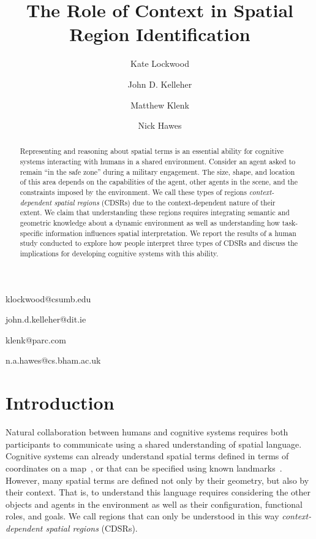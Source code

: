\documentclass[11pt,letterpaper]{article}
\begin{document}
 

\title{The Role of Context in Spatial Region Identification}
 
\author{Kate Lockwood}{klockwood@csumb.edu}
\address{ITCD Department, California State University - Monterey Bay}
\author{John D. Kelleher}{john.d.kelleher@dit.ie}
\address{Applied Intelligence Research Centre, Dublin Institute of Technology }
\author{Matthew Klenk}{klenk@parc.com}
\address{Palo Alto Research Center, Palo Alto CA }
\author{Nick Hawes}{n.a.hawes@cs.bham.ac.uk}
\address{School of Computer Science, University of Birmingham, UK }
\vskip 0.2in
 
\begin{abstract}
Representing and reasoning about spatial terms is an essential ability for cognitive systems interacting with humans in a shared environment.  Consider an agent asked to remain ``in the safe zone'' during a military engagement.  The size, shape, and location of this area depends on the capabilities of the agent, other agents in the scene, and the constraints imposed by the environment.  We call these types of regions \textit{context-dependent spatial regions} (CDSRs) due to the context-dependent nature of their extent.  We claim that understanding these regions requires integrating semantic and geometric knowledge about a dynamic environment as well as understanding how task-specific information influences spatial interpretation.  We report the results of a human study conducted to explore how people interpret three types of CDSRs and discuss the implications for developing cognitive systems with this ability.
\end{abstract}

\section{Introduction} 
Natural collaboration between humans and cognitive systems requires both participants to communicate using a shared understanding of spatial language.  Cognitive systems can already understand spatial terms defined in terms of coordinates on a map~\cite{Zender2008a}, or that can be specified using known landmarks~\cite{brenneretal07ijcai}.  However, many spatial terms are defined not only by their geometry, but also by their context.  That is, to understand this language requires considering the other objects and agents in the environment as well as their configuration, functional roles, and goals.  We call regions that can only be understood in this way \textit{context-dependent spatial regions} (CDSRs).
\end{document}
